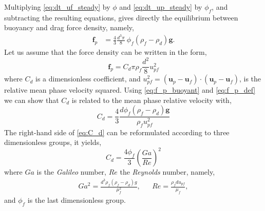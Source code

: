 Multiplying \ref{eq:dt_uf_steady} by $\phi$ and \ref{eq:dt_up_steady} by $\phi_f$, and subtracting the resulting equations, gives directly the equilibrium between buoyancy and drag force density, namely, 
\begin{align}
     \textbf{f}_p
    &= 
    \frac{4}{3}\frac{d^3 \pi}{8}\ \phi_f (\rho_f -\rho_d ) \textbf{g}. 
    \label{eq:f_p_buoyant}
\end{align}
Let us assume that the force density can be written in the form, 
\begin{equation}
    \textbf{f}_p = C_d  \pi \rho_f \frac{d^2}{8} u_{pf}^2
    \label{eq:f_p_def}
\end{equation}
where $C_d$ is a dimensionless coefficient, and $u_{pf}^2 = (\textbf{u}_p - \textbf{u}_f)\cdot (\textbf{u}_p - \textbf{u}_f)$, is the relative mean phase velocity squared. 
Using \ref{eq:f_p_buoyant}  and \ref{eq:f_p_def} we can show that $C_d$ is related to the mean phase relative velocity with, 
\begin{equation}
    C_d  
    = 
    \frac{4}{3}
    \frac{d \phi_f (\rho_f -\rho_d ) \textbf{g}}{\rho_f u_{pf}^2}
    \label{eq:C_d}
\end{equation}
The right-hand side of \ref{eq:C_d} can be reformulated according to three dimensionless groups, it yields, 
\begin{equation}
    C_d = 
    \frac{4\phi_f}{3} \left(\frac{Ga}{Re}\right)^2
    \label{eq:C_d_adim}
\end{equation}
where $Ga$ is the \textit{Galileo} number, $Re$ the \textit{Reynolds} number, namely, 
\begin{align}
    Ga^2 = \frac{
    d^3
    \rho_f
    (\rho_f -\rho_d ) g
}{\mu_f^2},
&& 
Re =   \frac{\rho_f d u_{pf}}{\mu_f},
\end{align}
and $\phi_f$ is the last dimensionless group. 

